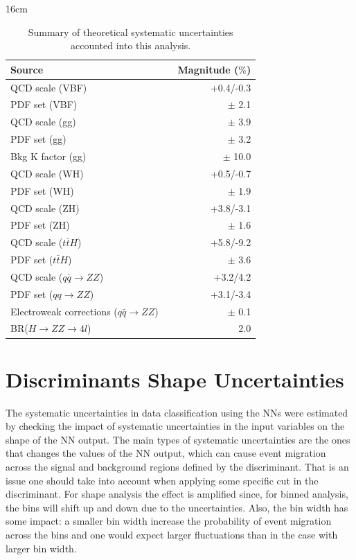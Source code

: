 \begin{table}[hbtp]{16cm}
	\label{tab:theorical_systematic_uncertainties}
	\caption{Summary of theoretical systematic uncertainties accounted into this analysis.}
	\centering
	\begin{tabular}{lcr}
		\hline
		\rowcolor{light_gray}
		Source && Magnitude ($\%$)\\
		\hline
		QCD scale (VBF)                                      && +0.4/-0.3\\
		PDF set (VBF)                                        && $\pm$ 2.1\\
		\hline
		QCD scale (gg)                                       && $\pm$ 3.9\\
		PDF set (gg)                                         && $\pm$ 3.2\\
		Bkg K factor (gg)                                    && $\pm$ 10.0\\
		QCD scale (WH)                                       && +0.5/-0.7\\
		PDF set (WH)                                         && $\pm$ 1.9\\
		QCD scale (ZH)                                       && +3.8/-3.1\\
		PDF set (ZH)                                         && $\pm$ 1.6\\
		QCD scale ($t\bar{t}H$)                              && +5.8/-9.2\\
		PDF set ($t\bar{t}H$)                                && $\pm$ 3.6\\
		QCD scale ($q\bar{q} \rightarrow ZZ$)                && +3.2/4.2\\
		PDF set ($qq \rightarrow ZZ$)                        && +3.1/-3.4\\
		Electroweak corrections ($q\bar{q} \rightarrow ZZ$)  && $\pm$ 0.1\\
		BR($H \rightarrow ZZ \rightarrow 4l$)                && 2.0\\
		\hline
	\end{tabular}
\end{table}


\section{Discriminants Shape Uncertainties}
\label{subsec:discriminants_shape_uncertainties}
The systematic uncertainties in data classification using the NNs were estimated by checking the impact of systematic uncertainties in the input variables on the shape of the NN output. The main types of systematic uncertainties are the ones that changes the values of the NN output, which can cause event migration across the signal and background regions defined by the discriminant. That is an issue one should take into account when applying some specific cut in the discriminant. For shape analysis the effect is amplified since, for binned analysis, the bins will shift up and down due to the uncertainties. Also, the bin width has some impact: a smaller bin width increase the probability of event migration across the bins and one would expect larger fluctuations than in the case with larger bin width.

